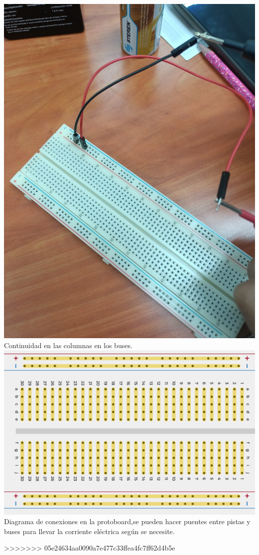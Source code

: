 \documentclass[10pt]{article}
\begin{document}
\begin{multicols}{2}
\begin{center}
	\includegraphics[scale = 0.1]{Imagenes/Fotos/ConColumnas.jpeg}\\
	Continuidad en las columnas en los buses.\\
	\includegraphics[scale = 0.4]{Imagenes/Fotos/Diagrama.png}\\
	Diagrama de conexiones en la protoboard,se pueden hacer puentes entre pistas y buses para llevar la corriente eléctrica según se necesite.
\end{center}
>>>>>>> 05e24634aa0090a7e477c33ffea4fc7ff62d4b5e


\end{multicols}
\end{document}
